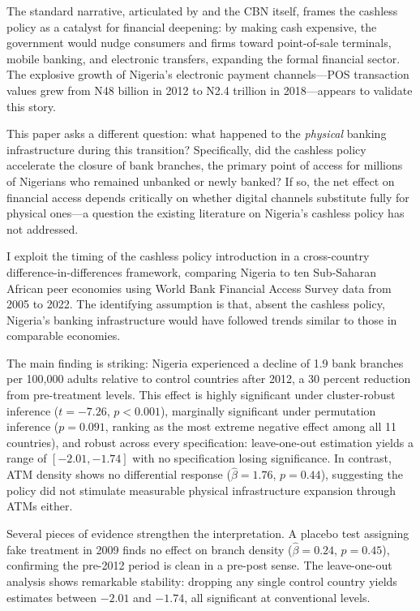 \documentclass[12pt]{article}
\begin{document}
The standard narrative, articulated by \citet{ozili2018impact} and the CBN itself, frames the cashless policy as a catalyst for financial deepening: by making cash expensive, the government would nudge consumers and firms toward point-of-sale terminals, mobile banking, and electronic transfers, expanding the formal financial sector. The explosive growth of Nigeria's electronic payment channels---POS transaction values grew from N48 billion in 2012 to N2.4 trillion in 2018---appears to validate this story.

This paper asks a different question: what happened to the \textit{physical} banking infrastructure during this transition? Specifically, did the cashless policy accelerate the closure of bank branches, the primary point of access for millions of Nigerians who remained unbanked or newly banked? If so, the net effect on financial access depends critically on whether digital channels substitute fully for physical ones---a question the existing literature on Nigeria's cashless policy has not addressed.

I exploit the timing of the cashless policy introduction in a cross-country difference-in-differences framework, comparing Nigeria to ten Sub-Saharan African peer economies using World Bank Financial Access Survey data from 2005 to 2022. The identifying assumption is that, absent the cashless policy, Nigeria's banking infrastructure would have followed trends similar to those in comparable economies.

The main finding is striking: Nigeria experienced a decline of 1.9 bank branches per 100,000 adults relative to control countries after 2012, a 30 percent reduction from pre-treatment levels. This effect is highly significant under cluster-robust inference ($t = -7.26$, $p < 0.001$), marginally significant under permutation inference ($p = 0.091$, ranking as the most extreme negative effect among all 11 countries), and robust across every specification: leave-one-out estimation yields a range of $[-2.01, -1.74]$ with no specification losing significance. In contrast, ATM density shows no differential response ($\hat{\beta} = 1.76$, $p = 0.44$), suggesting the policy did not stimulate measurable physical infrastructure expansion through ATMs either.

Several pieces of evidence strengthen the interpretation. A placebo test assigning fake treatment in 2009 finds no effect on branch density ($\hat{\beta} = 0.24$, $p = 0.45$), confirming the pre-2012 period is clean in a pre-post sense. The leave-one-out analysis shows remarkable stability: dropping any single control country yields estimates between $-2.01$ and $-1.74$, all significant at conventional levels.
\end{document}
